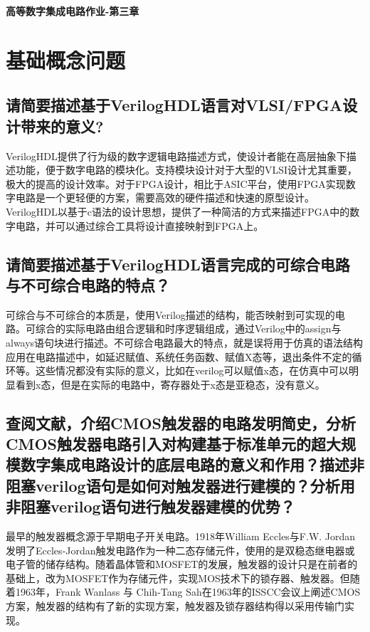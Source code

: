 \documentclass[12pt,a4paper]{ctexart}
\begin{document}
\begin{center}
    \LARGE \textbf{高等数字集成电路作业-第三章}
\end{center}

\section{基础概念问题}

\subsection{请简要描述基于VerilogHDL语言对VLSI/FPGA设计带来的意义?}

VerilogHDL提供了行为级的数字逻辑电路描述方式，使设计者能在高层抽象下描述功能，便于数字电路的模块化。支持模块设计对于大型的VLSI设计尤其重要，极大的提高的设计效率。对于FPGA设计，相比于ASIC平台，使用FPGA实现数字电路是一个更轻便的方案，需要高效的硬件描述和快速的原型设计。VerilogHDL以基于c语法的设计思想，提供了一种简洁的方式来描述FPGA中的数字电路，并可以通过综合工具将设计直接映射到FPGA上。

\subsection{请简要描述基于VerilogHDL语言完成的可综合电路与不可综合电路的特点？}

可综合与不可综合的本质是，使用Verilog描述的结构，能否映射到可实现的电路。可综合的实际电路由组合逻辑和时序逻辑组成，通过Verilog中的assign与always语句块进行描述。不可综合电路最大的特点，就是误将用于仿真的语法结构应用在电路描述中，如延迟赋值、系统任务函数、赋值X态等，退出条件不定的循环等。这些情况都没有实际的意义，比如在verilog可以赋值x态，在仿真中可以明显看到x态，但是在实际的电路中，寄存器处于x态是亚稳态，没有意义。

\subsection{查阅文献，介绍CMOS触发器的电路发明简史，分析CMOS触发器电路引入对构建基于标准单元的超大规模数字集成电路设计的底层电路的意义和作用？描述非阻塞verilog语句是如何对触发器进行建模的？分析用非阻塞verilog语句进行触发器建模的优势？}

最早的触发器概念源于早期电子开关电路。1918年William Eccles与F.W. Jordan发明了Eccles‑Jordan触发电路作为一种二态存储元件\cite{eccles}，使用的是双稳态继电器或电子管的储存结构。随着晶体管和MOSFET的发展，触发器的设计只是在前者的基础上，改为MOSFET作为存储元件，实现MOS技术下的锁存器、触发器。但随着1963年，Frank Wanlass 与 Chih-Tang Sah在1963年的ISSCC会议上阐述CMOS方案\cite{cmos}，触发器的结构有了新的实现方案，触发器及锁存器结构得以采用传输门实现。
\end{document}
